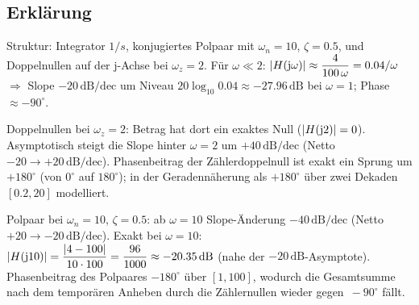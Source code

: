 \begin{center}
\end{center}
\newpage
\subsection{Erklärung}
\vspace{5mm}
\begin{description}[leftmargin=1.2em,labelsep=.6em,font=\bfseries]
\item[Schritt 1] Struktur: Integrator $1/s$, konjugiertes Polpaar mit $\omega_n=10$, $\zeta=0.5$, und Doppelnullen auf der j-Achse bei $\omega_z=2$. Für $\omega\ll2$: $|H(\operatorname{j}\!\omega)|\approx \dfrac{4}{100\,\omega}=0.04/\omega$ $\Rightarrow$ Slope $-20\,\mathrm{dB/dec}$ um Niveau $20\log_{10}0.04\approx-27.96\,\mathrm{dB}$ bei $\omega=1$; Phase $\approx-90^\circ$.
\item[Schritt 2] Doppelnullen bei $\omega_z=2$: Betrag hat dort ein exaktes Null ($|H(\operatorname{j}\!2)|=0$). Asymptotisch steigt die Slope hinter $\omega=2$ um $+40\,\mathrm{dB/dec}$ (Netto $-20\to+20\,\mathrm{dB/dec}$). Phasenbeitrag der Zählerdoppelnull ist exakt ein Sprung um $+180^\circ$ (von $0^\circ$ auf $180^\circ$); in der Geradennäherung als $+180^\circ$ über zwei Dekaden $[0.2,20]$ modelliert.
\item[Schritt 3] Polpaar bei $\omega_n=10$, $\zeta=0.5$: ab $\omega=10$ Slope-Änderung $-40\,\mathrm{dB/dec}$ (Netto $+20\to-20\,\mathrm{dB/dec}$). Exakt bei $\omega=10$: $|H(\operatorname{j}\!10)|=\dfrac{|4-100|}{10\cdot100}=\dfrac{96}{1000}\approx-20.35\,\mathrm{dB}$ (nahe der $-20\,\mathrm{dB}$-Asymptote). Phasenbeitrag des Polpaares $-180^\circ$ über $[1,100]$, wodurch die Gesamtsumme nach dem temporären Anheben durch die Zählernullen wieder gegen $\,-90^\circ$ fällt.
\end{description}

